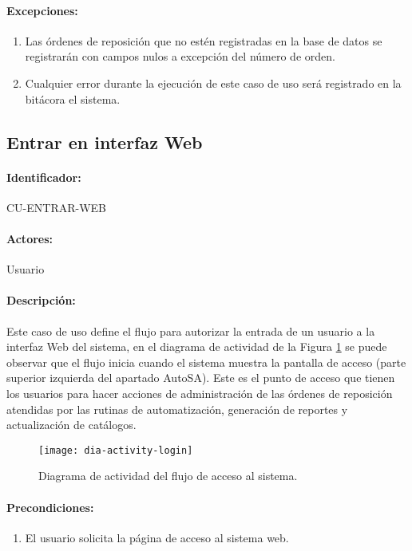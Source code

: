 \paragraph{Excepciones:}
\begin{enumerate}
  \item Las órdenes de reposición que no estén registradas en la base de datos se registrarán con campos nulos a excepción del número de orden.
  \item Cualquier error durante la ejecución de este caso de uso será registrado en la bitácora el sistema.
\end{enumerate}


\subsection{Entrar en interfaz Web}\label{cu-entrar-web}
\paragraph{Identificador:}
CU-ENTRAR-WEB
\paragraph{Actores:}
Usuario
\paragraph{Descripción:}
Este caso de uso define el flujo para autorizar la entrada de un usuario a la interfaz Web del sistema, en el diagrama de actividad de la Figura \ref{fig:dia-activity-login} se puede observar que el flujo inicia cuando el sistema muestra la pantalla de acceso (parte superior izquierda del apartado AutoSA). Este es el punto de acceso que tienen los usuarios para hacer acciones de administración de las órdenes de reposición atendidas por las rutinas de automatización, generación de reportes y actualización de catálogos.
\begin{figure}[h]
  \centering
  \texttt{[image: dia-activity-login]}
  \caption{Diagrama de actividad del flujo de acceso al sistema.}
  \label{fig:dia-activity-login}
\end{figure}
\paragraph{Precondiciones:}
\begin{enumerate}
  \item El usuario solicita la página de acceso al sistema web.
\end{enumerate}
